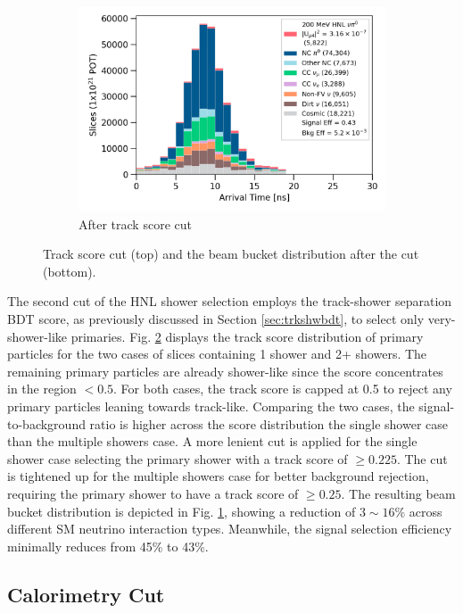 \begin{figure}[ht!]
\begin{subfigure}[b]{0.495\textwidth}
            \includegraphics[width=\textwidth]{beam_bucket_postrackscore}
            \caption{After track score cut}%
	    \label{fig:bb_track_score}
        \end{subfigure}
        \caption{
		Track score cut (top) and the beam bucket distribution after the cut (bottom). 
	}
        \label{fig:track_score_cut}
\end{figure}


The second cut of the HNL shower selection employs the track-shower separation BDT score, as previously discussed in Section \ref{sec:trkshwbdt}, to select only very-shower-like primaries.
Fig. \ref{fig:track_score_cut} displays the track score distribution of primary particles for the two cases of slices containing 1 shower and 2+ showers.
The remaining primary particles are already shower-like since the score concentrates in the region $< 0.5$.
For both cases, the track score is capped at 0.5 to reject any primary particles leaning towards track-like.
Comparing the two cases, the signal-to-background ratio is higher across the score distribution the single shower case than the multiple showers case.
A more lenient cut is applied for the single shower case selecting the primary shower with a track score of $\geq 0.225$.
The cut is tightened up for the multiple showers case for better background rejection, requiring the primary shower to have a track score of $\geq 0.25$.
The resulting beam bucket distribution is depicted in Fig. \ref{fig:bb_track_score}, showing a reduction of $3\sim16\%$ across different SM neutrino interaction types.
Meanwhile, the signal selection efficiency minimally reduces from 45\% to 43\%.

\subsection{Calorimetry Cut}
\label{sec:calo_cut}

